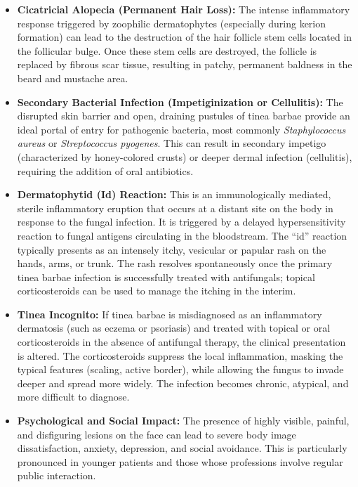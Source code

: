 \begin{itemize}
    \item \textbf{Cicatricial Alopecia (Permanent Hair Loss):} The intense inflammatory response triggered by zoophilic dermatophytes (especially during kerion formation) can lead to the destruction of the hair follicle stem cells located in the follicular bulge. Once these stem cells are destroyed, the follicle is replaced by fibrous scar tissue, resulting in patchy, permanent baldness in the beard and mustache area.
    \item \textbf{Secondary Bacterial Infection (Impetiginization or Cellulitis):} The disrupted skin barrier and open, draining pustules of tinea barbae provide an ideal portal of entry for pathogenic bacteria, most commonly \textit{Staphylococcus aureus} or \textit{Streptococcus pyogenes}. This can result in secondary impetigo (characterized by honey-colored crusts) or deeper dermal infection (cellulitis), requiring the addition of oral antibiotics.
    \item \textbf{Dermatophytid (Id) Reaction:} This is an immunologically mediated, sterile inflammatory eruption that occurs at a distant site on the body in response to the fungal infection. It is triggered by a delayed hypersensitivity reaction to fungal antigens circulating in the bloodstream. The ``id'' reaction typically presents as an intensely itchy, vesicular or papular rash on the hands, arms, or trunk. The rash resolves spontaneously once the primary tinea barbae infection is successfully treated with antifungals; topical corticosteroids can be used to manage the itching in the interim.
    \item \textbf{Tinea Incognito:} If tinea barbae is misdiagnosed as an inflammatory dermatosis (such as eczema or psoriasis) and treated with topical or oral corticosteroids in the absence of antifungal therapy, the clinical presentation is altered. The corticosteroids suppress the local inflammation, masking the typical features (scaling, active border), while allowing the fungus to invade deeper and spread more widely. The infection becomes chronic, atypical, and more difficult to diagnose.
    \item \textbf{Psychological and Social Impact:} The presence of highly visible, painful, and disfiguring lesions on the face can lead to severe body image dissatisfaction, anxiety, depression, and social avoidance. This is particularly pronounced in younger patients and those whose professions involve regular public interaction.
\end{itemize}

